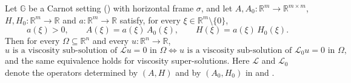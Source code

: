 \begin{theorem}
Let $\mathbb G$ be a Carnot setting () with horizontal frame
$\sigma$, and let
$A,A_0:\mathbb R^{m}\to\mathbb R^{m\times m}$, $H,H_0:\mathbb R^{m}\to\mathbb R$ and
$a:\mathbb R^{m}\to\mathbb R$ satisfy, for every $\xi\in\mathbb R^{m}\setminus\{0\}$,
\[
 a(\xi)>0,\qquad A(\xi)=a(\xi)\,A_0(\xi),\qquad H(\xi)=a(\xi)\,H_0(\xi).
\]
Then for every $\Omega\subseteq\mathbb R^{n}$ and every $u:\mathbb R^{n}\to\mathbb R$,
\[
 u \text{ is a viscosity sub-solution of } \mathcal Lu=0 \text{ in }\Omega
 \iff
 u \text{ is a viscosity sub-solution of } \mathcal L_0u=0 \text{ in }\Omega,
\]
and the same equivalence holds for viscosity super-solutions. Here $\mathcal L$ and
$\mathcal L_0$ denote the operators determined by $(A,H)$ and by $(A_0,H_0)$ in
 and .
\end{theorem}
